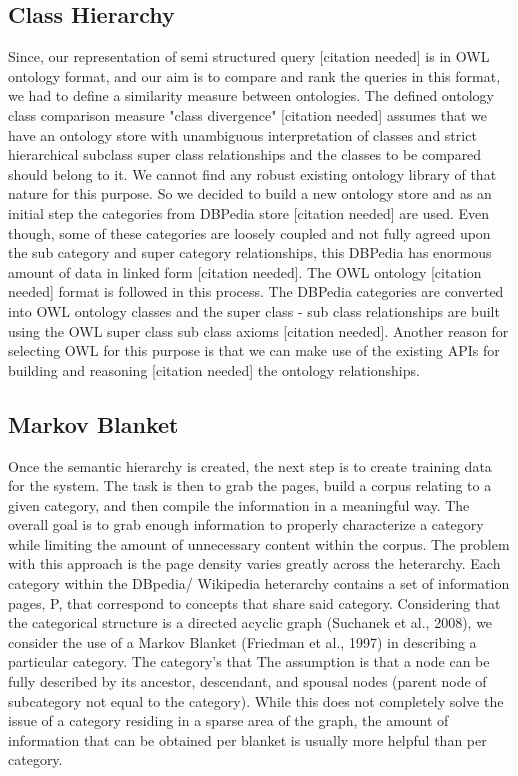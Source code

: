 \documentclass{www2010-submission}
\begin{document}
\subsection*{Class Hierarchy}
Since, our representation of semi structured query [citation needed] is in OWL ontology format, and our aim is to compare and rank the queries in this format, we had to define a similarity measure between ontologies. The defined ontology class comparison measure "class divergence" [citation needed] assumes that we have an ontology store with unambiguous interpretation of classes and strict hierarchical subclass super class relationships and the classes to be compared should belong to it. We cannot find any robust existing ontology library of that nature for this purpose. So we decided to build a new ontology store and as an initial step the categories from DBPedia store [citation needed] are used. Even though, some of these categories are loosely coupled and not fully agreed upon the sub category and super category relationships, this DBPedia has enormous amount of data in linked form [citation needed]. The OWL ontology [citation needed] format is followed in this process. The DBPedia categories are converted into OWL ontology classes and the super class - sub class relationships are built using the OWL super class sub class axioms [citation needed]. Another reason for selecting OWL for this purpose is that we can make use of the existing APIs for building and reasoning [citation needed] the ontology relationships.    



\subsection*{Markov Blanket}
Once the semantic hierarchy is created, the next step is to create training data for the system. The task is then to grab the pages, build a corpus relating to a given category, and then compile the information in a meaningful way. The overall goal is to grab enough information to properly characterize a category while limiting the amount of unnecessary content within the corpus. The problem with this approach is the page density varies greatly across the heterarchy. Each category within the DBpedia/ Wikipedia heterarchy contains a set of information pages, P, that correspond to concepts that share said category. Considering that the categorical structure is a directed acyclic graph (Suchanek et al., 2008), we consider the use of a Markov Blanket (Friedman et al., 1997) in describing a particular category. The category's that The assumption is that a node can be fully described by its ancestor, descendant, and spousal nodes (parent node of subcategory not equal to the category). While this does not completely solve the issue of a category residing in a sparse area of the graph, the amount of information that can be obtained per blanket is usually more helpful than per category.
\end{document}
